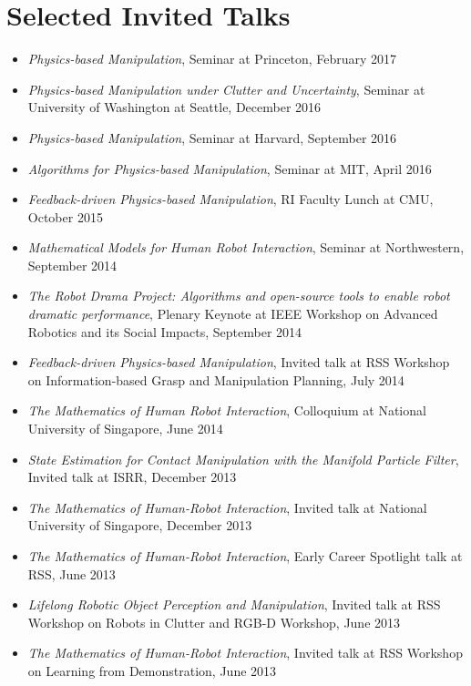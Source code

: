 
\section{Selected Invited Talks}
\begin{itemize}
\addtolength{\itemsep}{-0.5\baselineskip}
\item \textit{Physics-based Manipulation},
Seminar at Princeton, February 2017
\item \textit{Physics-based Manipulation under Clutter and Uncertainty},
Seminar at University of Washington at Seattle, December 2016
\item \textit{Physics-based Manipulation},
Seminar at Harvard, September 2016
\item \textit{Algorithms for Physics-based Manipulation},
Seminar at MIT, April 2016
\item \textit{Feedback-driven Physics-based Manipulation},
RI Faculty Lunch at CMU, October 2015
\item \textit{Mathematical Models for Human Robot Interaction},
Seminar at Northwestern, September 2014
\item \textit{The Robot Drama Project: Algorithms and open-source tools to enable robot dramatic performance},
Plenary Keynote at IEEE Workshop on Advanced Robotics and its Social Impacts, September 2014
\item \textit{Feedback-driven Physics-based Manipulation},
Invited talk at RSS Workshop on Information-based Grasp and Manipulation Planning, July 2014
\item \textit{The Mathematics of Human Robot Interaction},
Colloquium at National University of Singapore, June 2014
\item \textit{State Estimation for Contact Manipulation with the Manifold Particle Filter},
Invited talk at ISRR, December 2013
\item \textit{The Mathematics of Human-Robot Interaction},
Invited talk at National University of Singapore, December 2013
\item \textit{The Mathematics of Human-Robot Interaction},
Early Career Spotlight talk at RSS, June 2013
\item \textit{Lifelong Robotic Object Perception and Manipulation},
Invited talk at RSS Workshop on Robots in Clutter and RGB-D Workshop, June 2013
\item \textit{The Mathematics of Human-Robot Interaction},
Invited talk at RSS Workshop on Learning from Demonstration, June 2013

\end{itemize}
